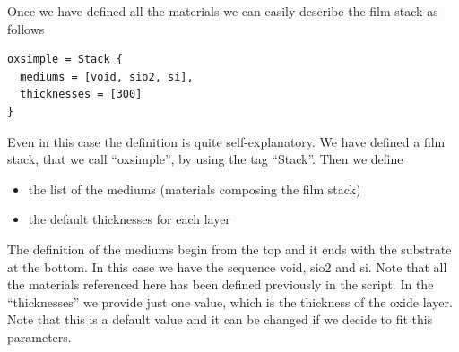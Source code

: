 \documentclass[a4paper]{report}
\begin{document}
Once we have defined all the materials we can easily describe the film
stack as follows
\begin{verbatim}
oxsimple = Stack {
  mediums = [void, sio2, si],
  thicknesses = [300]
}
\end{verbatim}

Even in this case the definition is quite self-explanatory. We have
defined a film stack, that we call ``oxsimple'', by using the tag
``Stack''. Then we define
\begin{itemize}
  \item the list of the mediums (materials composing the film stack)
  \item the default thicknesses for each layer
\end{itemize}
The definition of the mediums begin from the top and it ends with the
substrate at the bottom. In this case we have the sequence void, sio2
and si. Note that all the materials referenced here has been defined
previously in the script. In the ``thicknesses'' we provide just one
value, which is the thickness of the oxide layer. Note that this is a
default value and it can be changed if we decide to fit this
parameters.
\end{document}
